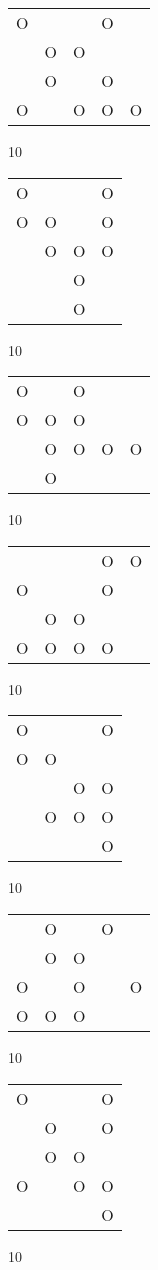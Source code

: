\begin{tabular}{|m{0.2cm}m{0.2cm}m{0.2cm}m{0.2cm}m{0.2cm}|}\hline
O& & &O& \\
 &O&O& & \\
 &O& &O& \\
O& &O&O&O\\
\hline\end{tabular}10
\begin{tabular}{|m{0.2cm}m{0.2cm}m{0.2cm}m{0.2cm}|}\hline
O& & &O\\
O&O& &O\\
 &O&O&O\\
 & &O& \\
 & &O& \\
\hline\end{tabular}10
\begin{tabular}{|m{0.2cm}m{0.2cm}m{0.2cm}m{0.2cm}m{0.2cm}|}\hline
O& &O& & \\
O&O&O& & \\
 &O&O&O&O\\
 &O& & & \\
\hline\end{tabular}10
\begin{tabular}{|m{0.2cm}m{0.2cm}m{0.2cm}m{0.2cm}m{0.2cm}|}\hline
 & & &O&O\\
O& & &O& \\
 &O&O& & \\
O&O&O&O& \\
\hline\end{tabular}10
\begin{tabular}{|m{0.2cm}m{0.2cm}m{0.2cm}m{0.2cm}|}\hline
O& & &O\\
O&O& & \\
 & &O&O\\
 &O&O&O\\
 & & &O\\
\hline\end{tabular}10
\begin{tabular}{|m{0.2cm}m{0.2cm}m{0.2cm}m{0.2cm}m{0.2cm}|}\hline
 &O& &O& \\
 &O&O& & \\
O& &O& &O\\
O&O&O& & \\
\hline\end{tabular}10
\begin{tabular}{|m{0.2cm}m{0.2cm}m{0.2cm}m{0.2cm}|}\hline
O& & &O\\
 &O& &O\\
 &O&O& \\
O& &O&O\\
 & & &O\\
\hline\end{tabular}10
